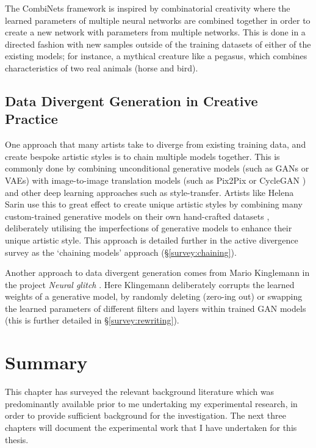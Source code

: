 The CombiNets framework \citep{guzdial2018combinets} is inspired by combinatorial creativity \citep{boden2004creative} where the learned parameters of multiple neural networks are combined together in order to create a new network with parameters from multiple networks.
This is done in a directed fashion with new samples outside of the training datasets of either of the existing models; for instance, a mythical creature like a pegasus, which combines characteristics of two real animals (horse and bird).

\subsection{Data Divergent Generation in Creative Practice}
\label{c2:subsec:divergent-practice}

One approach that many artists take to diverge from existing training data, and create bespoke artistic styles is to chain multiple models together. 
This is commonly done by combining unconditional generative models (such as GANs or VAEs) with image-to-image translation models (such as Pix2Pix \citep{isola2017image} or CycleGAN \citep{zhu2017unpaired}) and other deep learning approaches such as style-transfer.
Artists like Helena Sarin use this to great effect to create unique artistic styles by combining many custom-trained generative models on their own hand-crafted datasets \citep{sarin2018playing}, deliberately utilising the imperfections of generative models to enhance their unique artistic style. 
This approach is detailed further in the active divergence survey as the `chaining models' approach (\S \ref{survey:chaining}).

Another approach to data divergent generation comes from Mario Kinglemann in the project \textit{Neural glitch} \citep{klingemann2018neural}. 
Here Klingemann deliberately corrupts the learned weights of a generative model, by randomly deleting (zero-ing out) or swapping the learned parameters of different filters and layers within trained GAN models (this is further detailed in \S \ref{survey:rewriting}). 


\section{Summary}

This chapter has surveyed the relevant background literature which was predominantly available prior to me undertaking my experimental research, in order to provide sufficient background for the investigation.
The next three chapters will document the experimental work that I have undertaken for this thesis.

